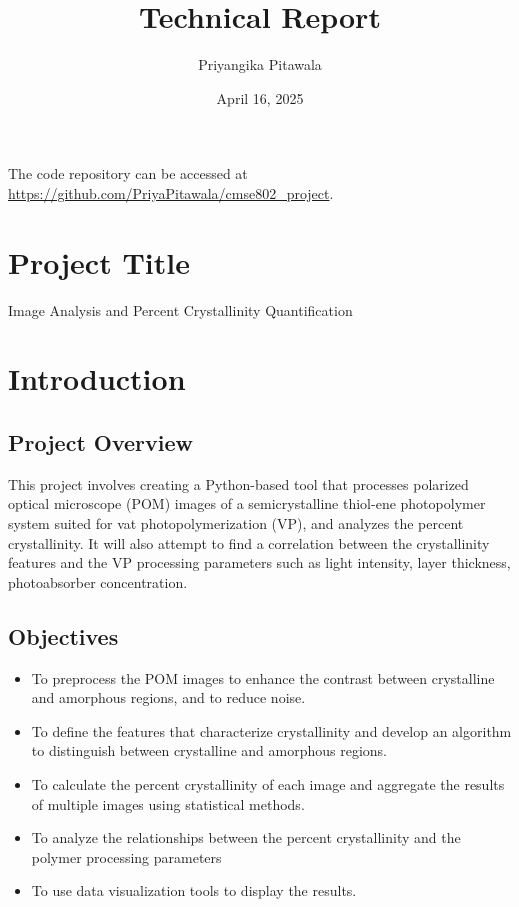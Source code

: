 \documentclass[12pt]{article}
\title{Technical Report}
\author{Priyangika Pitawala}
\date{April 16, 2025}
\begin{document}
\maketitle

The code repository can be accessed at \url{https://github.com/PriyaPitawala/cmse802_project}.

\section*{Project Title}
Image Analysis and Percent Crystallinity Quantification

\section{Introduction}

\subsection{Project Overview}
This project involves creating a Python-based tool that processes polarized optical microscope (POM) images of a semicrystalline
thiol-ene photopolymer system suited for vat photopolymerization (VP), and analyzes the percent crystallinity. It will also attempt to 
find a correlation between the crystallinity features and the VP processing parameters such as light intensity,
layer thickness, photoabsorber concentration.

\subsection{Objectives}
\begin{itemize}[noitemsep]
    \item To preprocess the POM images to enhance the contrast between crystalline and amorphous regions, and to reduce noise.
    \item To define the features that characterize crystallinity and develop an algorithm to distinguish between crystalline and amorphous regions.
    \item To calculate the percent crystallinity of each image and aggregate the results of multiple images using statistical methods.
    \item To analyze the relationships between the percent crystallinity and the polymer processing parameters
    \item To use data visualization tools to display the results.
    
\end{itemize}
\end{document}
